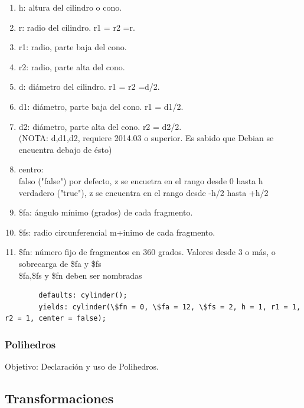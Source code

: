 \documentclass{article}
\begin{document}
\begin{enumerate}
    \item h: altura del cilindro o cono.
    \item r: radio del cilindro. r1 = r2 =r.
    \item r1: radio, parte baja del cono.
    \item r2: radio, parte alta del cono.
    \item d: diámetro del cilindro. r1 = r2 =d/2.
    \item d1: diámetro, parte baja del cono. r1 = d1/2.
    \item d2: diámetro, parte alta del cono. r2 = d2/2.\\
    (NOTA: d,d1,d2, requiere 2014.03 o superior. Es sabido que Debian se encuentra debajo de ésto)
    \item centro:\\
    falso ("false") por defecto, z se encuetra en el rango desde 0 hasta h\\
    verdadero ("true"), z se encuentra en el rango desde -h/2 hasta +h/2
    \item \$fa: ángulo mínimo (grados) de cada fragmento.
    \item \$fs: radio circunferencial m+inimo de cada fragmento.
    \item \$fn: número fijo de fragmentos en 360 grados. Valores desde 3 o más, o sobrecarga de \$fa y \$fs\\
    
    \$fa,\$fs y \$fn deben ser nombradas
\end{enumerate}
    
    \begin{verbatim}
        defaults: cylinder();  
        yields: cylinder(\$fn = 0, \$fa = 12, \$fs = 2, h = 1, r1 = 1, r2 = 1, center = false);
    \end{verbatim}

    
\subsubsection{Polihedros}

Objetivo: Declaración y uso de Polihedros.\citep{OpenSCS}\\

\subsection{Transformaciones}
\end{document}
